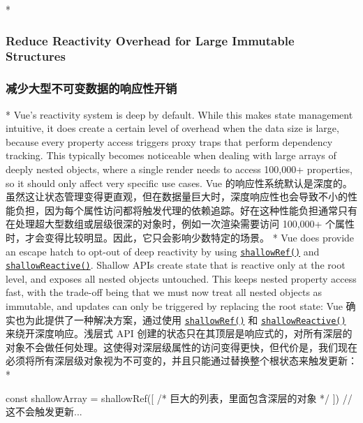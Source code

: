 \begin{paracol}{2} 
 
\switchcolumn[0]*%
\subsubsection{Reduce Reactivity Overhead for Large Immutable Structures}
\switchcolumn
\subsubsection{减少大型不可变数据的响应性开销}
\switchcolumn[0]*%
Vue's reactivity system is deep by default. While this makes state
management intuitive, it does create a certain level of overhead when
the data size is large, because every property access triggers proxy
traps that perform dependency tracking. This typically becomes
noticeable when dealing with large arrays of deeply nested objects,
where a single render needs to access 100,000+ properties, so it should
only affect very specific use cases.
\switchcolumn
Vue
的响应性系统默认是深度的。虽然这让状态管理变得更直观，但在数据量巨大时，深度响应性也会导致不小的性能负担，因为每个属性访问都将触发代理的依赖追踪。好在这种性能负担通常只有在处理超大型数组或层级很深的对象时，例如一次渲染需要访问
100,000+ 个属性时，才会变得比较明显。因此，它只会影响少数特定的场景。
\switchcolumn[0]*%
Vue does provide an escape hatch to opt-out of deep reactivity by using
\href{https://vuejs.org/api/reactivity-advanced.html\#shallowref}{\texttt{shallowRef()}}
and
\href{https://vuejs.org/api/reactivity-advanced.html\#shallowreactive}{\texttt{shallowReactive()}}.
Shallow APIs create state that is reactive only at the root level, and
exposes all nested objects untouched. This keeps nested property access
fast, with the trade-off being that we must now treat all nested objects
as immutable, and updates can only be triggered by replacing the root
state:
\switchcolumn
Vue 确实也为此提供了一种解决方案，通过使用
\href{https://cn.vuejs.org/api/reactivity-advanced.html\#shallowref}{\texttt{shallowRef()}}
和
\href{https://cn.vuejs.org/api/reactivity-advanced.html\#shallowreactive}{\texttt{shallowReactive()}}
来绕开深度响应。浅层式 API
创建的状态只在其顶层是响应式的，对所有深层的对象不会做任何处理。这使得对深层级属性的访问变得更快，但代价是，我们现在必须将所有深层级对象视为不可变的，并且只能通过替换整个根状态来触发更新：
\switchcolumn[0]*%
\begin{codeJs}
const shallowArray = shallowRef([
  /* 巨大的列表，里面包含深层的对象 */
])
// 这不会触发更新...

\end{codeJs}
\end{paracol}
